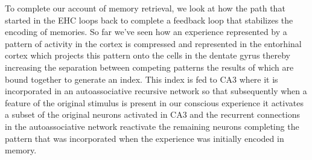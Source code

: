


To complete our account of memory retrieval, we look at how the path that started in the EHC loops back to complete a feedback loop that stabilizes the encoding of memories. So far we've seen how an experience represented by a pattern of activity in the cortex is compressed and represented in the entorhinal cortex which projects this pattern onto the cells in the dentate gyrus thereby increasing the separation between competing patterns the results of which are bound together to generate an index. This index is fed to CA3 where it is incorporated in an autoassociative recursive network so that subsequently when a feature of the original stimulus is present in our conscious experience it activates a subset of the original neurons activated in CA3 and the recurrent connections in the autoassociative network reactivate the remaining neurons completing the pattern that was incorporated when the experience was initially encoded in memory.
  



